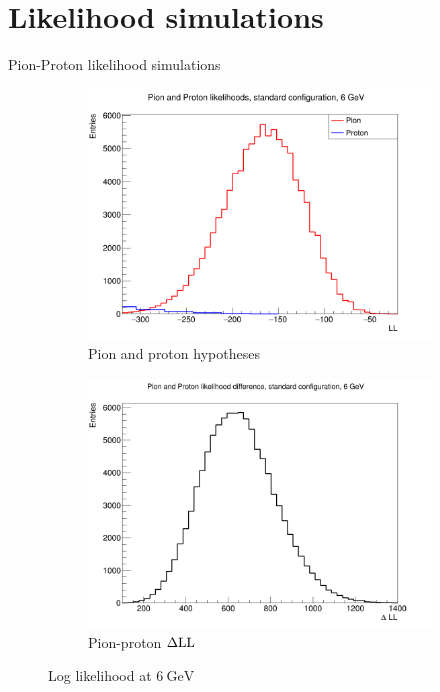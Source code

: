 \documentclass{beamer}
\begin{document}
\section{Likelihood simulations}
\begin{frame}{Pion-Proton likelihood simulations}
  \begin{figure}
    \centering
    \vspace{-0.2cm}
    \begin{subfigure}{0.5\textwidth}
      \includegraphics[width = 1.0\textwidth]{Plots/ProtonPionLL6GeVStandard.png}
      \caption{Pion and proton hypotheses}
    \end{subfigure}%
    \begin{subfigure}{0.5\textwidth}
      \includegraphics[width = 1.0\textwidth]{Plots/ProtonPionDLL6GeVStandard.png}
      \caption{Pion-proton $\Delta{\rm LL}$}
    \end{subfigure}
    \caption{Log likelihood at $\SI{6}{\giga\eV}$}
  \end{figure}
\end{frame}
\end{document}
